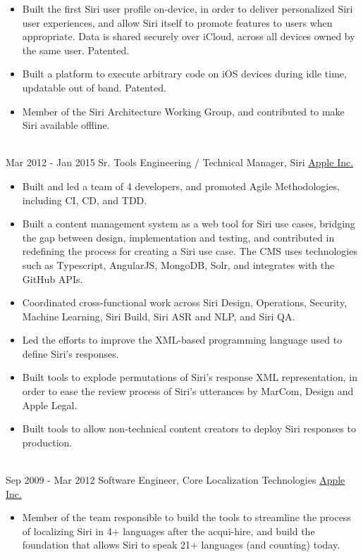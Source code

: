 \documentclass[letterpaper]{twentysecondcv} %
\begin{document}
\begin{twenty}
{{\begin{itemize}
        \item Built the first Siri user profile on-device, in order to deliver personalized Siri user experiences, and allow Siri itself to promote features to users when appropriate. Data is shared securely over iCloud, across all devices owned by the same user. Patented.
        \item Built a platform to execute arbitrary code on iOS devices during idle time, updatable out of band. Patented.
        \item Member of the Siri Architecture Working Group, and contributed to make Siri available offline.
        \end{itemize}}
        }
    \\
    \twentyitem
        {Mar 2012 -}
        {Jan 2015}
        {Sr. Tools Engineering / Technical Manager, Siri}
        {\href{http://www.apple.com}{Apple Inc.}}
        {}
        {
        {\begin{itemize}
        \item Built and led a team of 4 developers, and promoted Agile Methodologies, including CI, CD, and TDD.
        \item Built a content management system as a web tool for Siri use cases, bridging the gap between design, implementation and testing, and contributed in redefining the process for creating a Siri use case. The CMS uses technologies such as Typescript, AngularJS, MongoDB, Solr, and integrates with the GitHub APIs.
        \item Coordinated cross-functional work across Siri Design, Operations, Security, Machine Learning, Siri Build, Siri ASR and NLP, and Siri QA.
        \item Led the efforts to improve the XML-based programming language used to define Siri's responses.
        \item Built tools to explode permutations of Siri's response XML representation, in order to ease the review process of Siri's 
        utterances by MarCom, Design and Apple Legal.
        \item Built tools to allow non-technical content creators to deploy Siri responses to production.
        \end{itemize}}
        }
    \\
	\twentyitem
    	{Sep 2009 -}
		{Mar 2012}
        {Software Engineer, Core Localization Technologies}
        {\href{http://www.apple.com}{Apple Inc.}}
        {}
        {
        {\begin{itemize}
        \item Member of the team responsible to build the tools to streamline the process of localizing Siri in 4+ languages after the acqui-hire, and build the foundation that allows Siri to speak 21+ languages (and counting) today.

\end{itemize}}}
\end{twenty}
\end{document}
